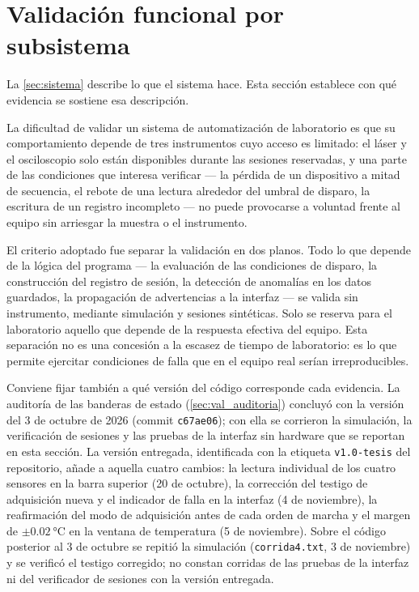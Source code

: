 \section{Validación funcional por subsistema}
\label{sec:validacion}

La \cref{sec:sistema} describe lo que el sistema hace. Esta sección
establece con qué evidencia se sostiene esa descripción.

La dificultad de validar un sistema de automatización de laboratorio es
que su comportamiento depende de tres instrumentos cuyo acceso es
limitado: el láser y el osciloscopio solo están disponibles durante las
sesiones reservadas, y una parte de las condiciones que interesa
verificar --- la pérdida de un dispositivo a mitad de secuencia, el
rebote de una lectura alrededor del umbral de disparo, la escritura de
un registro incompleto --- no puede provocarse a voluntad frente al
equipo sin arriesgar la muestra o el instrumento.

El criterio adoptado fue separar la validación en dos planos. Todo lo
que depende de la lógica del programa --- la evaluación de las
condiciones de disparo, la construcción del registro de sesión, la
detección de anomalías en los datos guardados, la propagación de
advertencias a la interfaz --- se valida sin instrumento, mediante
simulación y sesiones sintéticas. Solo se reserva para el laboratorio
aquello que depende de la respuesta efectiva del equipo. Esta
separación no es una concesión a la escasez de tiempo de laboratorio:
es lo que permite ejercitar condiciones de falla que en el equipo real
serían irreproducibles.

Conviene fijar también a qué versión del código corresponde cada
evidencia. La auditoría de las banderas de estado
(\cref{sec:val_auditoria}) concluyó con la versión del 3 de octubre de
2026 (commit \texttt{c67ae06}); con ella se corrieron la simulación, la
verificación de sesiones y las pruebas de la interfaz sin hardware que
se reportan en esta sección. La versión entregada, identificada con la
etiqueta \texttt{v1.0-tesis} del repositorio, añade a aquella cuatro
cambios: la lectura individual de los cuatro sensores en la barra
superior (20 de octubre), la corrección del testigo de adquisición
nueva y el indicador de falla en la interfaz (4 de noviembre), la reafirmación del modo de
adquisición antes de cada orden de marcha y el margen de
$\pm\SI{0.02}{\celsius}$ en la ventana de temperatura (5 de
noviembre). Sobre el código posterior al 3 de octubre se repitió la
simulación (\texttt{corrida4.txt}, 3 de noviembre) y se verificó el
testigo corregido; no constan corridas de las pruebas de la interfaz ni
del verificador de sesiones con la versión entregada.

